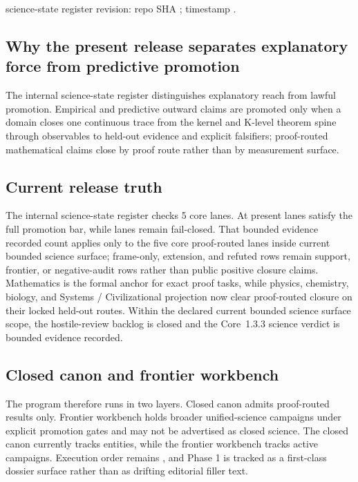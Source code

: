 science-state register revision: repo SHA ; timestamp .

\subsection{Why the present release separates explanatory force from predictive promotion}
The internal science-state register distinguishes explanatory reach from lawful promotion. Empirical and predictive outward claims are promoted only when a domain closes one continuous trace from the kernel and K-level theorem spine through observables to held-out evidence and explicit falsifiers; proof-routed mathematical claims close by proof route rather than by measurement surface.

\subsection{Current release truth}
The internal science-state register checks 5 core lanes. At present  lanes satisfy the full promotion bar, while  lanes remain fail-closed.
That bounded evidence recorded count applies only to the five core proof-routed lanes inside current bounded science surface; frame-only, extension, and refuted rows remain support, frontier, or negative-audit rows rather than public positive closure claims.
Mathematics is the formal anchor for exact proof tasks, while physics, chemistry, biology, and Systems / Civilizational projection now clear proof-routed closure on their locked held-out routes. Within the declared current bounded science surface scope, the hostile-review backlog is closed and the Core~1.3.3 science verdict is bounded evidence recorded.

\subsection{Closed canon and frontier workbench}
The program therefore runs in two layers. Closed canon admits proof-routed results only. Frontier workbench holds broader unified-science campaigns under explicit promotion gates and may not be advertised as closed science.
The closed canon currently tracks  entities, while the frontier workbench tracks  active campaigns.
Execution order remains , and Phase 1 is tracked as a first-class dossier surface rather than as drifting editorial filler text.

